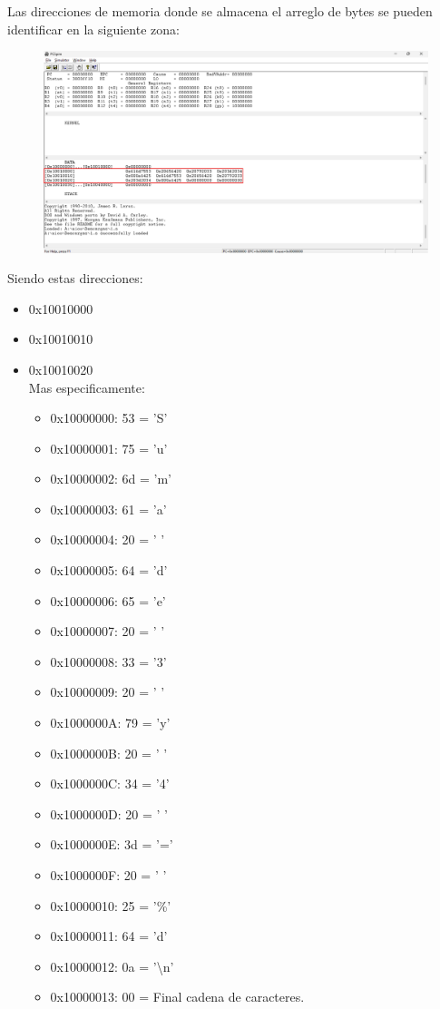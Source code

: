 \documentclass{templateNote}
\begin{document}
\begin{enumerate}[label=\alph*)]
    Las direcciones de memoria donde se almacena el arreglo de bytes se pueden identificar en la siguiente zona:
    \begin{figure}[H]
        \centering
        \includegraphics[width=1\textwidth]{img/img3.png}
    \end{figure}
    Siendo estas direcciones:
    \begin{itemize}
        \item 0x10010000
        \item 0x10010010
        \item 0x10010020
        \\Mas especificamente:
        \begin{itemize}
            \item 0x10000000: 53 = 'S'
            \item 0x10000001: 75 = 'u'
            \item 0x10000002: 6d = 'm'
            \item 0x10000003: 61 = 'a'
            \item 0x10000004: 20 = ' '
            \item 0x10000005: 64 = 'd'
            \item 0x10000006: 65 = 'e'
            \item 0x10000007: 20 = ' '
            \item 0x10000008: 33 = '3'
            \item 0x10000009: 20 = ' '
            \item 0x1000000A: 79 = 'y'
            \item 0x1000000B: 20 = ' '
            \item 0x1000000C: 34 = '4'
            \item 0x1000000D: 20 = ' '
            \item 0x1000000E: 3d = '='
            \item 0x1000000F: 20 = ' '
            \item 0x10000010: 25 = '\%'
            \item 0x10000011: 64 = 'd'
            \item 0x10000012: 0a = '\textbackslash n'
            \item 0x10000013: 00 = Final cadena de caracteres.
        \end{itemize}
    \end{itemize}


\end{enumerate}
\end{document}
